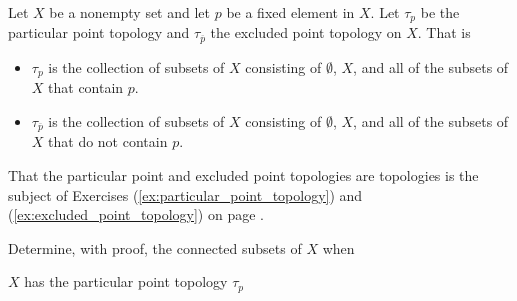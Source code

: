 \ea

\begin{comment}

\ExerciseSolution

\ba

\item The only open set that contains $X$ is $X$ itself, so there is no separation of $X$. Thus, $X$ is connected.

\item Consider $X$ with the topology $\tau_2 = \{U \subseteq X \mid 0 \in U\} \cup \{\emptyset\}$. 
	\begin{enumerate}[i.]
	\item If $U$ and $V$ are open sets, then $0 \in U$ and $0 \in V$. So $0 \in U \cap Y \cap X$. Thus, there is no separation of $X$ and $X$ is connected. 
	
	\item Let $Y = X \setminus \{0\}$, and let $U = \R^+ \cup \{0\}$ and $V = \R^- \cup \{0\}$. Then $U \cap Y \neq \emptyset$, $V \cap Y \neq \emptyset$, $Y \subseteq U \cup V$, and $U \cap V \cap Y = \emptyset$. So $U$ and $V$ form a separation of $Y$ and $Y$ is disconnected. 
	
	\end{enumerate}

\ea

\end{comment}

\item \label{ex:particular_point_connected} Let $X$ be a nonempty set and let $p$ be a fixed element in $X$. Let $\tau_p$ be the particular point topology and $\tau_{\overline{p}}$ the excluded point topology on $X$. That is
\begin{itemize}
\item $\tau_{p}$ is the collection of subsets of $X$ consisting of $\emptyset$, $X$, and all of the subsets of $X$ that contain $p$.  
\item $\tau_{\overline{p}}$ is the collection of subsets of $X$ consisting of $\emptyset$, $X$, and all of the subsets of $X$ that do not contain $p$.
\end{itemize}
That the particular point and excluded point topologies are topologies is the subject of Exercises (\ref{ex:particular_point_topology}) and (\ref{ex:excluded_point_topology}) on page \pageref{ex:particular_point_topology}. 

Determine, with proof, the connected subsets of $X$ when 
\ba
\item $X$ has the particular point topology $\tau_p$

